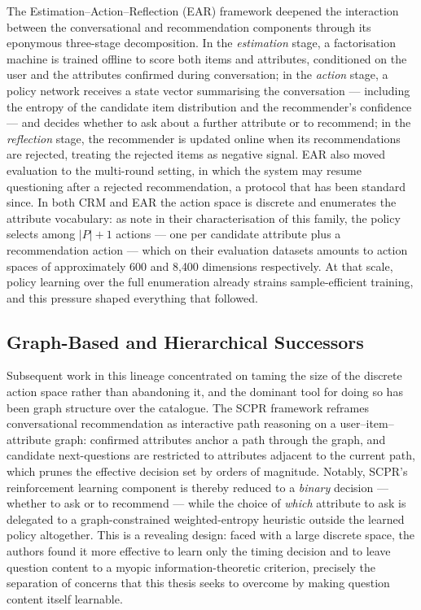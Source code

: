 The Estimation--Action--Reflection (EAR) framework \citep{lei2020estimation} deepened the interaction between the conversational and recommendation components through its eponymous three-stage decomposition. In the \textit{estimation} stage, a factorisation machine is trained offline to score both items and attributes, conditioned on the user and the attributes confirmed during conversation; in the \textit{action} stage, a policy network receives a state vector summarising the conversation — including the entropy of the candidate item distribution and the recommender's confidence — and decides whether to ask about a further attribute or to recommend; in the \textit{reflection} stage, the recommender is updated online when its recommendations are rejected, treating the rejected items as negative signal. EAR also moved evaluation to the multi-round setting, in which the system may resume questioning after a rejected recommendation, a protocol that has been standard since. In both CRM and EAR the action space is discrete and enumerates the attribute vocabulary: as \citet{lei2020interactive} note in their characterisation of this family, the policy selects among $|P|+1$ actions — one per candidate attribute plus a recommendation action — which on their evaluation datasets amounts to action spaces of approximately 600 and 8{,}400 dimensions respectively. At that scale, policy learning over the full enumeration already strains sample-efficient training, and this pressure shaped everything that followed.

\subsection{Graph-Based and Hierarchical Successors}

Subsequent work in this lineage concentrated on taming the size of the discrete action space rather than abandoning it, and the dominant tool for doing so has been graph structure over the catalogue. The SCPR framework \citep{lei2020interactive} reframes conversational recommendation as interactive path reasoning on a user--item--attribute graph: confirmed attributes anchor a path through the graph, and candidate next-questions are restricted to attributes adjacent to the current path, which prunes the effective decision set by orders of magnitude. Notably, SCPR's reinforcement learning component is thereby reduced to a \textit{binary} decision — whether to ask or to recommend — while the choice of \textit{which} attribute to ask is delegated to a graph-constrained weighted-entropy heuristic outside the learned policy altogether. This is a revealing design: faced with a large discrete space, the authors found it more effective to learn only the timing decision and to leave question content to a myopic information-theoretic criterion, precisely the separation of concerns that this thesis seeks to overcome by making question content itself learnable.


